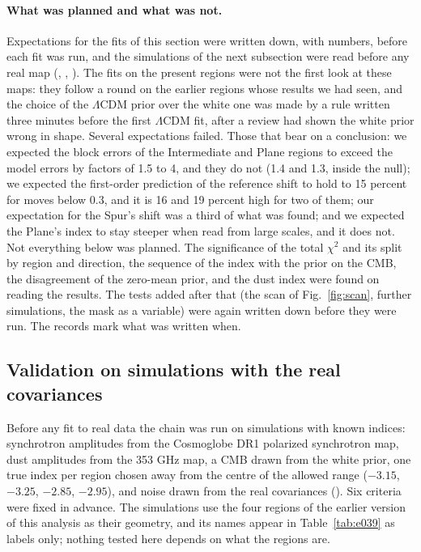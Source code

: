 \paragraph{What was planned and what was not.} Expectations for the fits of this section were written
down, with numbers, before each fit was run, and the simulations of the next subsection were read
before any real map (, , ). The fits on the present regions were
not the first look at these maps: they follow a round on the earlier regions whose results we had
seen, and the choice of the $\Lambda$CDM prior over the white one was made by a rule written three
minutes before the first $\Lambda$CDM fit, after a review had shown the white prior wrong in shape.
Several expectations failed. Those that bear on a conclusion: we expected the block errors of the
Intermediate and Plane regions to exceed the model errors by factors of 1.5 to 4, and they do not
(1.4 and 1.3, inside the null); we expected the first-order prediction of the reference shift to hold
to 15 percent for moves below 0.3, and it is 16 and 19 percent high for two of them; our expectation
for the Spur's shift was a third of what was found; and we expected the Plane's index to stay steeper
when read from large scales, and it does not. Not everything below was planned. The significance of
the total $\chi^2$ and its split by region and direction, the sequence of the index with the prior
on the CMB, the disagreement of the zero-mean prior, and the dust index were found on reading the
results. The tests added after that (the scan of Fig.~\ref{fig:scan}, further simulations, the mask
as a variable) were again written down before they were run. The records mark what was written when.

\subsection{Validation on simulations with the real covariances}

Before any fit to real data the chain was run on simulations with known indices: synchrotron
amplitudes from the Cosmoglobe DR1 polarized synchrotron map, dust amplitudes from the 353 GHz map,
a CMB drawn from the white prior, one true index per region chosen away from the centre of the allowed
range ($-3.15$, $-3.25$, $-2.85$, $-2.95$), and noise drawn from the real covariances
(). Six criteria were fixed in advance. The simulations use the four regions of the earlier
version of this analysis as their geometry, and its names appear in Table~\ref{tab:e039} as labels
only; nothing tested here depends on what the regions are.

